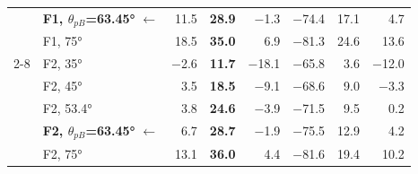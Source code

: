 \begin{table}[H]
\begin{tabular}{@{}llrrrrrr@{}}
 & \textbf{F1, $\theta_{pB}$=63.45°} $\leftarrow$ & 11.5 & \cellcolor{mejor}\textbf{28.9} & \cellcolor{peor}$-$1.3 & \cellcolor{peor}$-$74.4 & 17.1 & 4.7 \\
 & F1, 75° & 18.5 & \cellcolor{mejor}\textbf{35.0} & 6.9 & \cellcolor{peor}$-$81.3 & 24.6 & 13.6 \\
\cmidrule(l){2-8}
 & F2, 35° & \cellcolor{peor}$-$2.6 & \cellcolor{mejor}\textbf{11.7} & \cellcolor{peor}$-$18.1 & \cellcolor{peor}$-$65.8 & 3.6 & \cellcolor{peor}$-$12.0 \\
 & F2, 45° & 3.5 & \cellcolor{mejor}\textbf{18.5} & \cellcolor{peor}$-$9.1 & \cellcolor{peor}$-$68.6 & 9.0 & \cellcolor{peor}$-$3.3 \\
 & F2, 53.4° & 3.8 & \cellcolor{mejor}\textbf{24.6} & \cellcolor{peor}$-$3.9 & \cellcolor{peor}$-$71.5 & 9.5 & 0.2 \\
 & \textbf{F2, $\theta_{pB}$=63.45°} $\leftarrow$ & 6.7 & \cellcolor{mejor}\textbf{28.7} & \cellcolor{peor}$-$1.9 & \cellcolor{peor}$-$75.5 & 12.9 & 4.2 \\
 & F2, 75° & 13.1 & \cellcolor{mejor}\textbf{36.0} & 4.4 & \cellcolor{peor}$-$81.6 & 19.4 & 10.2 \\
\bottomrule
\end{tabular}
\end{table}
